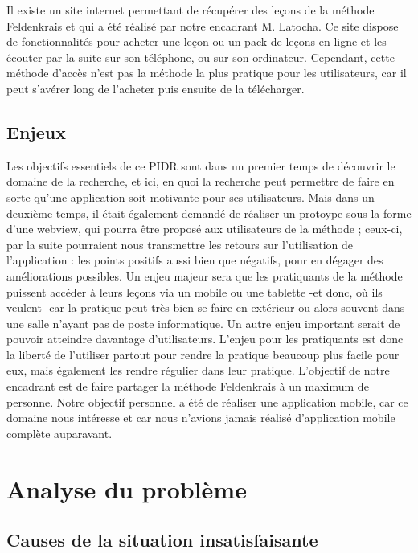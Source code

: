 \documentclass[pidr]{tnreport}
\begin{document}
Il existe un site internet permettant de récupérer des leçons de la méthode Feldenkrais et qui a été réalisé par notre encadrant M. Latocha. Ce site dispose de fonctionnalités pour acheter une leçon ou un pack de leçons en ligne et les écouter par la suite sur son téléphone, ou sur son ordinateur. Cependant, cette méthode d’accès n’est pas la méthode la plus pratique pour les utilisateurs, car il peut s’avérer long de l’acheter puis ensuite de la télécharger.

\section{Enjeux}

Les objectifs essentiels de ce PIDR sont dans un premier temps de découvrir le domaine de la recherche, et ici, en quoi la recherche peut permettre de faire en sorte qu’une application soit motivante pour ses utilisateurs. Mais dans un deuxième temps, il était également demandé de réaliser un protoype sous la forme d’une webview, qui pourra être proposé aux utilisateurs de la méthode ; ceux-ci, par la suite pourraient nous transmettre les retours sur l’utilisation de l’application : les points positifs aussi bien que négatifs, pour en dégager des améliorations possibles. Un enjeu majeur sera que les pratiquants de la méthode puissent accéder à leurs leçons via un mobile ou une tablette -et donc, où ils veulent- car la pratique peut très bien se faire en extérieur ou alors souvent dans une salle n’ayant pas de poste informatique. Un autre enjeu important serait de pouvoir atteindre davantage d’utilisateurs. L’enjeu pour les pratiquants est donc la liberté de l’utiliser partout pour rendre la pratique beaucoup plus facile pour eux, mais également les rendre régulier dans leur pratique. L’objectif de notre encadrant est de faire partager la méthode Feldenkrais à un maximum de personne. Notre objectif personnel a été de réaliser une application mobile, car ce domaine nous intéresse et car nous n’avions jamais réalisé d’application mobile complète auparavant.

\chapter{Analyse du problème}

\section{Causes de la situation insatisfaisante}
\end{document}
